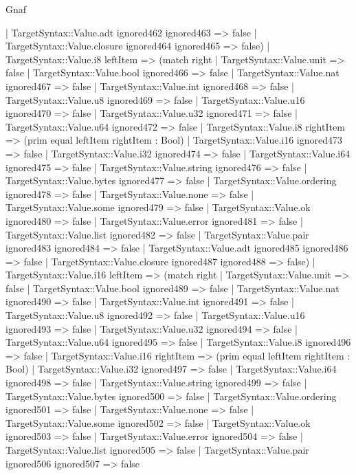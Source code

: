 \begin{lexlean}{Gnaf}
\begin{semanticmodule}
{      | TargetSyntax::Value.adt ignored462 ignored463 => false
      | TargetSyntax::Value.closure ignored464 ignored465 => false)
    | TargetSyntax::Value.i8 leftItem => (match right
      | TargetSyntax::Value.unit => false
      | TargetSyntax::Value.bool ignored466 => false
      | TargetSyntax::Value.nat ignored467 => false
      | TargetSyntax::Value.int ignored468 => false
      | TargetSyntax::Value.u8 ignored469 => false
      | TargetSyntax::Value.u16 ignored470 => false
      | TargetSyntax::Value.u32 ignored471 => false
      | TargetSyntax::Value.u64 ignored472 => false
      | TargetSyntax::Value.i8 rightItem => (prim equal leftItem rightItem : Bool)
      | TargetSyntax::Value.i16 ignored473 => false
      | TargetSyntax::Value.i32 ignored474 => false
      | TargetSyntax::Value.i64 ignored475 => false
      | TargetSyntax::Value.string ignored476 => false
      | TargetSyntax::Value.bytes ignored477 => false
      | TargetSyntax::Value.ordering ignored478 => false
      | TargetSyntax::Value.none => false
      | TargetSyntax::Value.some ignored479 => false
      | TargetSyntax::Value.ok ignored480 => false
      | TargetSyntax::Value.error ignored481 => false
      | TargetSyntax::Value.list ignored482 => false
      | TargetSyntax::Value.pair ignored483 ignored484 => false
      | TargetSyntax::Value.adt ignored485 ignored486 => false
      | TargetSyntax::Value.closure ignored487 ignored488 => false)
    | TargetSyntax::Value.i16 leftItem => (match right
      | TargetSyntax::Value.unit => false
      | TargetSyntax::Value.bool ignored489 => false
      | TargetSyntax::Value.nat ignored490 => false
      | TargetSyntax::Value.int ignored491 => false
      | TargetSyntax::Value.u8 ignored492 => false
      | TargetSyntax::Value.u16 ignored493 => false
      | TargetSyntax::Value.u32 ignored494 => false
      | TargetSyntax::Value.u64 ignored495 => false
      | TargetSyntax::Value.i8 ignored496 => false
      | TargetSyntax::Value.i16 rightItem => (prim equal leftItem rightItem : Bool)
      | TargetSyntax::Value.i32 ignored497 => false
      | TargetSyntax::Value.i64 ignored498 => false
      | TargetSyntax::Value.string ignored499 => false
      | TargetSyntax::Value.bytes ignored500 => false
      | TargetSyntax::Value.ordering ignored501 => false
      | TargetSyntax::Value.none => false
      | TargetSyntax::Value.some ignored502 => false
      | TargetSyntax::Value.ok ignored503 => false
      | TargetSyntax::Value.error ignored504 => false
      | TargetSyntax::Value.list ignored505 => false
      | TargetSyntax::Value.pair ignored506 ignored507 => false
}
\end{semanticmodule}
\end{lexlean}
